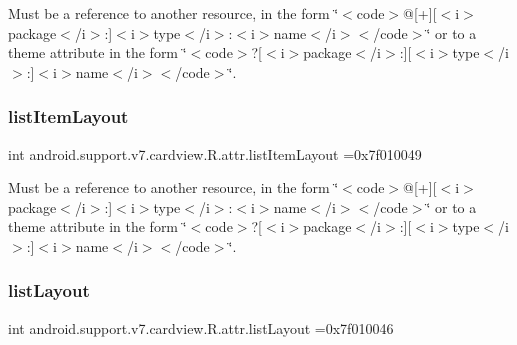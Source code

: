 Must be a reference to another resource, in the form \char`\"{}$<$code$>$@\mbox{[}+\mbox{]}\mbox{[}$<$i$>$package$<$/i$>$\+:\mbox{]}$<$i$>$type$<$/i$>$\+:$<$i$>$name$<$/i$>$$<$/code$>$\char`\"{} or to a theme attribute in the form \char`\"{}$<$code$>$?\mbox{[}$<$i$>$package$<$/i$>$\+:\mbox{]}\mbox{[}$<$i$>$type$<$/i$>$\+:\mbox{]}$<$i$>$name$<$/i$>$$<$/code$>$\char`\"{}. \mbox{\label{classandroid_1_1support_1_1v7_1_1cardview_1_1R_1_1attr_afd49174db57b9f2cf1ab07944689c3ef}} 
\subsubsection{\texorpdfstring{list\+Item\+Layout}{listItemLayout}}
{\footnotesize\ttfamily int android.\+support.\+v7.\+cardview.\+R.\+attr.\+list\+Item\+Layout =0x7f010049\hspace{0.3cm}{\ttfamily [static]}}

Must be a reference to another resource, in the form \char`\"{}$<$code$>$@\mbox{[}+\mbox{]}\mbox{[}$<$i$>$package$<$/i$>$\+:\mbox{]}$<$i$>$type$<$/i$>$\+:$<$i$>$name$<$/i$>$$<$/code$>$\char`\"{} or to a theme attribute in the form \char`\"{}$<$code$>$?\mbox{[}$<$i$>$package$<$/i$>$\+:\mbox{]}\mbox{[}$<$i$>$type$<$/i$>$\+:\mbox{]}$<$i$>$name$<$/i$>$$<$/code$>$\char`\"{}. \mbox{\label{classandroid_1_1support_1_1v7_1_1cardview_1_1R_1_1attr_a1180c355e7f55ee08b35f8f665cb9a6d}} 
\subsubsection{\texorpdfstring{list\+Layout}{listLayout}}
{\footnotesize\ttfamily int android.\+support.\+v7.\+cardview.\+R.\+attr.\+list\+Layout =0x7f010046\hspace{0.3cm}{\ttfamily [static]}}

